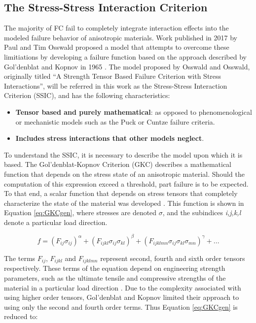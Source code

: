 \documentclass[main.tex]{subfiles}
\begin{document}
\subsection{The Stress-Stress Interaction Criterion}\label{ssec:SSIC}

The majority of FC fail to completely integrate interaction effects into the modeled failure behavior of anisotropic materials. Work published in 2017 by Paul and Tim Osswald \cite{Osswald2017a} proposed a model that attempts to overcome these limitiations by developing a failure function based on the approach described by Gol'denblat and Kopnov in 1965 \cite{Goldenblat1965}. The model proposed by Osswald and Osswald, originally titled \textquotedblleft A Strength Tensor Based Failure Criterion with Stress Interactions\textquotedblright, will be referred in this work as the Stress-Stress Interaction Criterion (SSIC), and has the following characteristics:

\begin{itemize}
	\item \textbf{Tensor based and purely mathematical}: as opposed to phenomenological or mechanistic models such as the Puck or Cuntze failure criteria.
	\item \textbf{Includes stress interactions that other models neglect}.
\end{itemize}

To understand the SSIC, it is necessary to describe the model upon which it is based. The Gol'denblat-Kopnov Criterion (GKC) describes a mathematical function that depends on the stress state of an anisotropic material. Should the computation of this expression exceed a threshold, part failure is to be expected. To that end, a scalar function that depends on stress tensors that completely characterize the state of the material was developed \cite{Goldenblat1965}. This function is shown in Equation \ref{eq:GKCgen}, where stresses are denoted $\sigma$, and the subindices \emph{i,j,k,l} denote a particular load direction.

\begin{equation} \label{eq:GKCgen}
f=(F_{ij}\sigma_{ij})^\alpha + (F_{ijkl}\sigma_{ij}\sigma_{kl})^\beta + (F_{ijklmn}\sigma_{ij}\sigma_{kl}\sigma_{mn})^\gamma + ...
\end{equation}

The terms $F_{ij}$, $F_{ijkl}$ and $F_{ijklmn}$ represent second, fourth and sixth order tensors respectively. These terms of the equation depend on engineering strength parameters, such as the ultimate tensile and compressive strengths of the material in a particular load direction \cite{Osswald2017a}. Due to the complexity associated with using higher order tensors, Gol'denblat and Kopnov limited their approach to using only the second and fourth order terms. Thus Equation \ref{eq:GKCgen} is reduced to:
\end{document}
